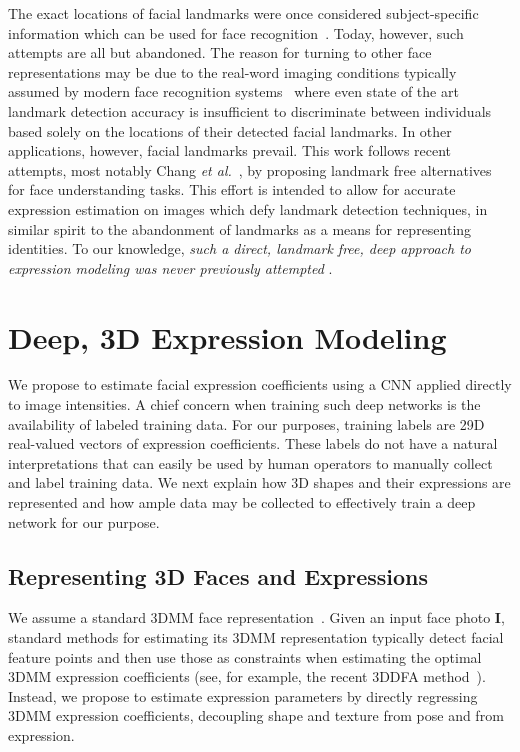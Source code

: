 \documentclass[a4paper, 10pt, conference]{ieeeconf}
\def\mbf#1{\mathbf{#1}}
\begin{document}
The exact locations of facial landmarks were once considered subject-specific information which can be used for face recognition~\cite{edwards1998face}. Today, however, such attempts are all but abandoned. The reason for turning to other face representations may be due to the real-word imaging conditions typically assumed by modern face recognition systems~\cite{Klare_2015_CVPR} where even state of the art landmark detection accuracy is insufficient to discriminate between individuals based solely on the locations of their detected facial landmarks. In other applications, however, facial landmarks prevail. This work follows recent attempts, most notably Chang {\em et al.}~\cite{chang17fpn}, by proposing landmark free alternatives for face understanding tasks. This effort is intended to allow for accurate expression estimation on images which defy landmark detection techniques, in similar spirit to the abandonment of landmarks as a means for representing identities. To our knowledge, {\em such a direct, landmark free, deep approach to expression modeling was never previously attempted} .


\section{Deep, 3D Expression Modeling}\label{sec:deepexpr}
We propose to estimate facial expression coefficients using a CNN applied directly to image intensities. A chief concern when training such deep networks is the availability of labeled training data. For our purposes, training labels are 29D real-valued vectors of expression coefficients. These labels do not have a natural interpretations that can easily be used by human operators to manually collect and label training data. We next explain how 3D shapes and their expressions are represented and how ample data may be collected to effectively train a deep network for our purpose.


\subsection{Representing 3D Faces and Expressions}\label{sec:background}
We assume a standard 3DMM face representation~\cite{blanz2002face,blanz2003face,chu2014,hu2016face,paysan09basel}. Given an input face photo $\mbf{I}$, standard methods for estimating its 3DMM representation typically detect facial feature points and then use those as constraints when estimating the optimal 3DMM expression coefficients (see, for example, the recent 3DDFA method~\cite{zhu2015}). Instead, we propose to estimate expression parameters by directly regressing 3DMM expression coefficients, decoupling shape and texture from pose and from expression.
\end{document}
